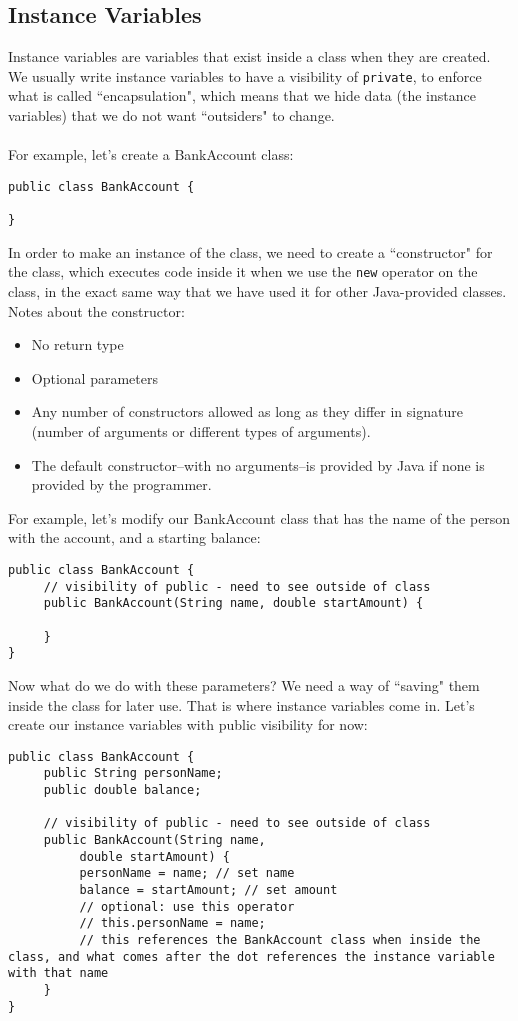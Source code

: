 \subsection{Instance Variables}
Instance variables are variables that exist inside a class when they are created. We usually write instance variables to have a visibility of \verb|private|, to enforce what is called ``encapsulation", which means that we hide data (the instance variables) that we do not want ``outsiders" to change. 
\\ \\
For example, let's create a BankAccount class:
\begin{lstlisting}
public class BankAccount {
	
}
\end{lstlisting}
In order to make an instance of the class, we need to create a ``constructor" for the class, which executes code inside it when we use the \verb|new| operator on the class, in the exact same way that we have used it for other Java-provided classes. Notes about the constructor:
\begin{itemize}
\item No return type
\item Optional parameters
\item Any number of constructors allowed as long as they differ in signature (number of arguments or different types of arguments).
\item The default constructor--with no arguments--is provided by Java if none is provided by the programmer.
\end{itemize}
For example, let's modify our BankAccount class that has the name of the person with the account, and a starting balance:
\begin{lstlisting}
public class BankAccount {
     // visibility of public - need to see outside of class	
     public BankAccount(String name, double startAmount) {
	
     }
}
\end{lstlisting}
Now what do we do with these parameters? We need a way of ``saving" them inside the class for later use. That is where instance variables come in. Let's create our instance variables with public visibility for now:
\begin{lstlisting}
public class BankAccount {
     public String personName;
     public double balance;
     
     // visibility of public - need to see outside of class	
     public BankAccount(String name, 
          double startAmount) {
          personName = name; // set name
          balance = startAmount; // set amount
          // optional: use this operator
          // this.personName = name;
          // this references the BankAccount class when inside the class, and what comes after the dot references the instance variable with that name
     }
}
\end{lstlisting}
